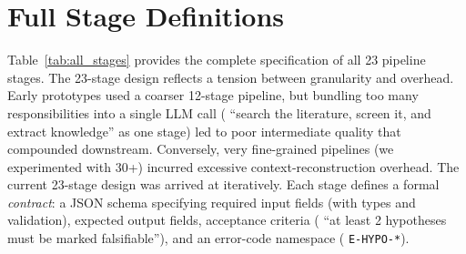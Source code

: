 
\section{Full Stage Definitions}
\label{app:stages}

Table~\ref{tab:all_stages} provides the complete specification of all 23 pipeline
stages. The 23-stage design reflects a tension between granularity and overhead.
Early prototypes used a coarser 12-stage pipeline, but bundling too many
responsibilities into a single LLM call (\eg{} ``search the literature, screen it,
and extract knowledge'' as one stage) led to poor intermediate quality that
compounded downstream. Conversely, very fine-grained pipelines (we experimented
with 30+) incurred excessive context-reconstruction overhead. The current 23-stage
design was arrived at iteratively. Each stage defines a formal \emph{contract}: a
JSON schema specifying required input fields (with types and validation), expected
output fields, acceptance criteria (\eg{} ``at least 2 hypotheses must be marked
falsifiable''), and an error-code namespace (\eg{} \texttt{E-HYPO-*}).

